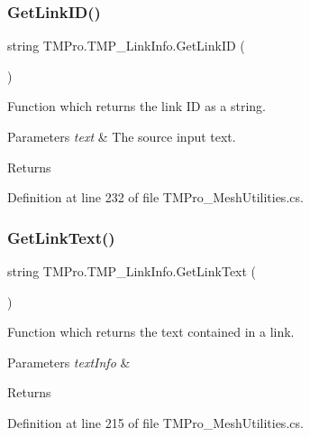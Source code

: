 \subsubsection{\texorpdfstring{GetLinkID()}{GetLinkID()}}
{\footnotesize\ttfamily string T\+M\+Pro.\+T\+M\+P\+\_\+\+Link\+Info.\+Get\+Link\+ID (\begin{DoxyParamCaption}{ }\end{DoxyParamCaption})}



Function which returns the link ID as a string. 


\begin{DoxyParams}{Parameters}
{\em text} & The source input text.\\
\hline
\end{DoxyParams}
\begin{DoxyReturn}{Returns}

\end{DoxyReturn}


Definition at line 232 of file T\+M\+Pro\+\_\+\+Mesh\+Utilities.\+cs.

\mbox{\label{struct_t_m_pro_1_1_t_m_p___link_info_a8d7343120f5d1fb29227802fae0f9b0f}} 
\subsubsection{\texorpdfstring{GetLinkText()}{GetLinkText()}}
{\footnotesize\ttfamily string T\+M\+Pro.\+T\+M\+P\+\_\+\+Link\+Info.\+Get\+Link\+Text (\begin{DoxyParamCaption}{ }\end{DoxyParamCaption})}



Function which returns the text contained in a link. 


\begin{DoxyParams}{Parameters}
{\em text\+Info} & \\
\hline
\end{DoxyParams}
\begin{DoxyReturn}{Returns}

\end{DoxyReturn}


Definition at line 215 of file T\+M\+Pro\+\_\+\+Mesh\+Utilities.\+cs.

